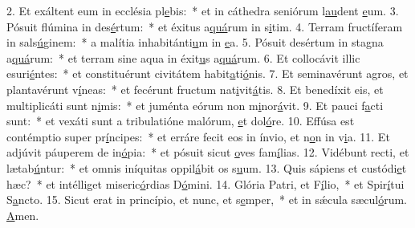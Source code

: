 2. Et exáltent eum in ecclésia pl\uline{e}bis:~* et in cáthedra seniórum l\uline{au}dent \uline{e}um.
3. Pósuit flúmina in des\uline{é}rtum:~* et éxitus a\uline{quá}rum in s\uline{i}tim.
4. Terram fructíferam in sals\uline{ú}ginem:~* a malítia inhabitánti\uline{u}m in \uline{e}a.
5. Pósuit desértum in stagna a\uline{quá}rum:~* et terram sine aqua in éxit\uline{u}s a\uline{quá}rum.
6. Et collocávit illic esuri\uline{é}ntes:~* et constituérunt civitátem habit\uline{a}ti\uline{ó}nis.
7. Et seminavérunt agros, et plantavérunt v\uline{í}neas:~* et fecérunt fructum nat\uline{i}vit\uline{á}tis.
8. Et benedíxit eis, et multiplicáti sunt n\uline{i}mis:~* et juménta eórum non m\uline{i}nor\uline{á}vit.
9. Et pauci f\uline{a}cti sunt:~* et vexáti sunt a tribulatióne malórum, \uline{e}t dol\uline{ó}re.
10. Effúsa est contémptio super pr\uline{í}ncipes:~* et erráre fecit eos in ínvio, et n\uline{o}n in v\uline{i}a.
11. Et adjúvit páuperem de in\uline{ó}pia:~* et pósuit sicut \uline{o}ves fam\uline{í}lias.
12. Vidébunt recti, et lætab\uline{ú}ntur:~* et omnis iníquitas oppil\uline{á}bit os s\uline{u}um.
13. Quis sápiens et custódi\uline{e}t hæc?~* et intélliget miseric\uline{ó}rdias D\uline{ó}mini.
14. Glória Patri, et F\uline{í}lio,~* et Spir\uline{í}tui S\uline{a}ncto.
15. Sicut erat in princípio, et nunc, et s\uline{e}mper,~* et in sǽcula sæcul\uline{ó}rum. \uline{A}men.
